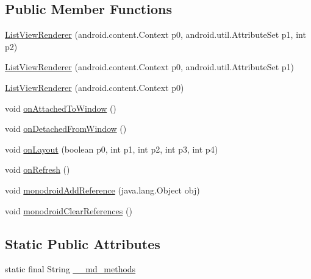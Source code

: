 \subsection*{Public Member Functions}
\begin{CompactItemize}
\item 
\hyperlink{classmd5b60ffeb829f638581ab2bb9b1a7f4f3f_1_1_list_view_renderer_dd061c8b593d05e8c08a3b32390f1693}{ListViewRenderer} (android.content.Context p0, android.util.AttributeSet p1, int p2)
\item 
\hyperlink{classmd5b60ffeb829f638581ab2bb9b1a7f4f3f_1_1_list_view_renderer_e63e27dcc4de3ca21c49eba92efaaca0}{ListViewRenderer} (android.content.Context p0, android.util.AttributeSet p1)
\item 
\hyperlink{classmd5b60ffeb829f638581ab2bb9b1a7f4f3f_1_1_list_view_renderer_94f680200f61591dc6b8b56984ea1db5}{ListViewRenderer} (android.content.Context p0)
\item 
void \hyperlink{classmd5b60ffeb829f638581ab2bb9b1a7f4f3f_1_1_list_view_renderer_e8bbcebd2d1fba70c74cfdf6c44e755d}{onAttachedToWindow} ()
\item 
void \hyperlink{classmd5b60ffeb829f638581ab2bb9b1a7f4f3f_1_1_list_view_renderer_d69b0d3bf09e4c1ec70515fab015975e}{onDetachedFromWindow} ()
\item 
void \hyperlink{classmd5b60ffeb829f638581ab2bb9b1a7f4f3f_1_1_list_view_renderer_aab562eda2712d67615715b8aa3d00c7}{onLayout} (boolean p0, int p1, int p2, int p3, int p4)
\item 
void \hyperlink{classmd5b60ffeb829f638581ab2bb9b1a7f4f3f_1_1_list_view_renderer_8dd7354cec7536410158693968e43b0f}{onRefresh} ()
\item 
void \hyperlink{classmd5b60ffeb829f638581ab2bb9b1a7f4f3f_1_1_list_view_renderer_86959f77d1bb744ab196062ffa0c4a1a}{monodroidAddReference} (java.lang.Object obj)
\item 
void \hyperlink{classmd5b60ffeb829f638581ab2bb9b1a7f4f3f_1_1_list_view_renderer_a025a82d6f89159ae49a0b1b53722295}{monodroidClearReferences} ()
\end{CompactItemize}
\subsection*{Static Public Attributes}
\begin{CompactItemize}
\item 
static final String \hyperlink{classmd5b60ffeb829f638581ab2bb9b1a7f4f3f_1_1_list_view_renderer_d5546d58609fec476ca441ccf586e954}{\_\-\_\-md\_\-methods}
\end{CompactItemize}
